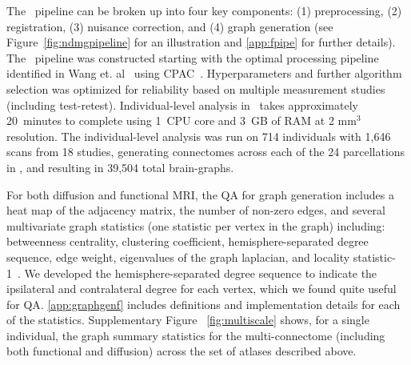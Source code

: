\documentclass[11pt]{article}
\begin{document}
The \ndmgf~pipeline can be broken up into four key components: (1) preprocessing, (2) registration, (3) nuisance correction, and (4) graph generation (see Figure~\ref{fig:ndmgpipeline} for an illustration and  \ref{app:fpipe} for further details).
The \ndmgf~pipeline was constructed starting with the optimal processing pipeline identified in Wang et. al~\cite{discriminability} using CPAC~\cite{cpac}. Hyperparameters and further algorithm selection was optimized for reliability based on multiple measurement studies (including test-retest).
Individual-level analysis in \ndmgf~takes approximately 20~minutes to complete using 1~CPU core and 3~GB of RAM at 2 mm$^3$resolution.
The individual-level analysis was run on 714 individuals with 1,646 scans from 18 studies, generating connectomes across each of the 24 parcellations in \ndmgd, and resulting in 39,504 total brain-graphs.



For both diffusion and functional MRI, the QA for graph generation includes a heat map of the adjacency matrix, the number of non-zero edges, and several multivariate graph statistics (one statistic per vertex in the graph) including:  betweenness centrality, clustering coefficient, hemisphere-separated degree sequence, edge weight, eigenvalues of the graph laplacian, and locality statistic-1~\cite{glocal}.
We developed the hemisphere-separated degree sequence to indicate the ipsilateral and contralateral degree for each vertex, which we found quite useful for QA.  
\ref{app:graphgenf} includes definitions and implementation details for each of the statistics.
Supplementary Figure ~\ref{fig:multiscale} shows, for a single individual, the graph summary statistics for the multi-connectome (including both functional and diffusion) across the set of atlases described above.
\end{document}
